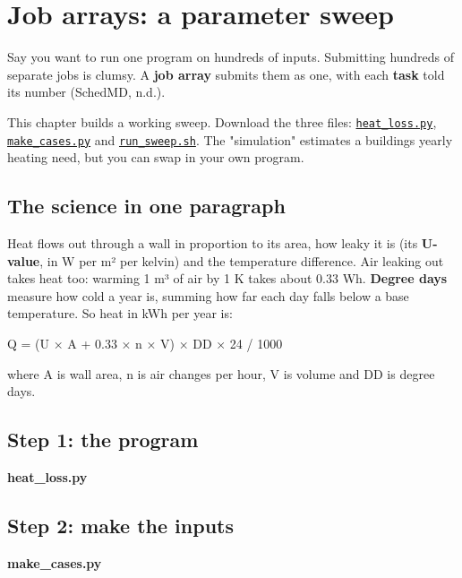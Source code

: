 \chapter{Job arrays: a parameter sweep}
\label{ch:arrays}

Say you want to run one program on hundreds of inputs. Submitting hundreds of separate jobs is clumsy. A \textbf{job array} submits them as one, with each \textbf{task} told its number (SchedMD, n.d.).

This chapter builds a working sweep. Download the three files: \href{examples/heat_loss.py}{\texttt{heat\_loss.py}}, \href{examples/make_cases.py}{\texttt{make\_cases.py}} and \href{examples/run_sweep.sh}{\texttt{run\_sweep.sh}}. The "simulation" estimates a building\textquotesingle s yearly heating need, but you can swap in your own program.

\section{The science in one paragraph}\label{the-science-in-one-paragraph}

Heat flows out through a wall in proportion to its area, how leaky it is (its \textbf{U-value}, in W per m² per kelvin) and the temperature difference. Air leaking out takes heat too: warming 1 m³ of air by 1 K takes about 0.33 Wh. \textbf{Degree days} measure how cold a year is, summing how far each day falls below a base temperature. So heat in kWh per year is:

Q = (U × A + 0.33 × n × V) × DD × 24 / 1000

where A is wall area, n is air changes per hour, V is volume and DD is degree days.

\section{Step 1: the program}\label{step-1-the-program}

\textbf{heat\_loss.py}



\section{Step 2: make the inputs}\label{step-2-make-the-inputs}

\textbf{make\_cases.py}



